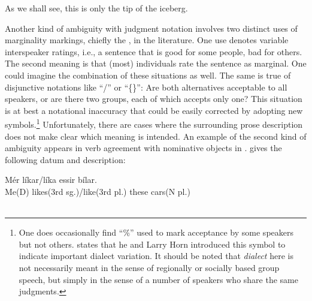 \noindent
As we shall see, this is only the tip of the iceberg.

Another kind of ambiguity with judgment notation involves two distinct uses of marginality markings, chiefly the , in the literature. One use denotes variable interspeaker ratings, i.e., a sentence that is good for some people, bad for others. The second meaning is that (most) individuals rate the sentence as marginal. One could imagine the combination of these situations as well. The same is true of disjunctive notations like ``/'' or ``\{\}'': Are both alternatives acceptable to all speakers, or are there two groups, each of which accepts only one? This situation is at best a notational inaccuracy that could be easily corrected by adopting new symbols.\footnote{One does occasionally find ``\%'' used to mark acceptance by some speakers but not others. \citet{Neubauer1976} states that he and Larry Horn introduced this symbol to indicate important dialect variation. It should be noted that \textit{dialect} here is not necessarily meant in the sense of regionally or
socially based group speech, but simply in the sense of a number of speakers who share the same judgments.
}
 Unfortunately, there are cases where the surrounding
prose description does not make clear which meaning is intended. An example of the second kind of ambiguity appears in verb agreement with nominative objects in . \citet{Thrainsson1979} gives the following datum and description:

\ea\label{ex:2:9}
\gll Mér {líkar/líka} {\th}essir bílar.\\
{Me(D)} {likes(3rd sg.)/like(3rd pl.)} these cars(N{ }pl.)\\
\glt [= Thráinsson's (3), p. 466]\\
 \z

